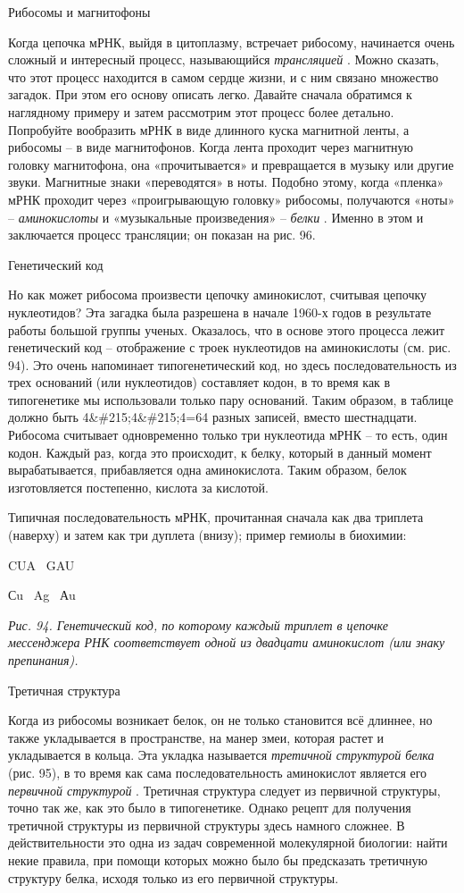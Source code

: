 \documentclass[../main.tex]{subfiles}
\begin{document}
Рибосомы и магнитофоны

Когда цепочка мРНК, выйдя в цитоплазму, встречает рибосому, начинается очень сложный и интересный процесс, называющийся \emph{трансляцией} . Можно сказать, что этот процесс находится в самом сердце жизни, и с ним связано множество загадок. При этом его основу описать легко. Давайте сначала обратимся к наглядному примеру и затем рассмотрим этот процесс более детально. Попробуйте вообразить мРНК в виде длинного куска магнитной ленты, а рибосомы \--- в виде магнитофонов. Когда лента проходит через магнитную головку магнитофона, она «прочитывается» и превращается в музыку или другие звуки. Магнитные знаки «переводятся» в ноты. Подобно этому, когда «пленка» мРНК проходит через «проигрывающую головку» рибосомы, получаются «ноты» \--- \emph{аминокислоты} и «музыкальные произведения» \--- \emph{белки} . Именно в этом и заключается процесс трансляции; он показан на рис. 96.

Генетический код

Но как может рибосома произвести цепочку аминокислот, считывая цепочку нуклеотидов? Эта загадка была разрешена в начале 1960-х годов в результате работы большой группы ученых. Оказалось, что в основе этого процесса лежит генетический код \--- отображение с троек нуклеотидов на аминокислоты (см. рис. 94). Это очень напоминает типогенетический код, но здесь последовательность из трех оснований (или нуклеотидов) составляет кодон, в то время как в типогенетике мы использовали только пару оснований. Таким образом, в таблице должно быть 4\&\#215;4\&\#215;4=64 разных записей, вместо шестнадцати. Рибосома считывает одновременно только три нуклеотида мРНК \--- то есть, один кодон. Каждый раз, когда это происходит, к белку, который в данный момент вырабатывается, прибавляется одна аминокислота. Таким образом, белок изготовляется постепенно, кислота за кислотой.

Типичная последовательность мРНК, прочитанная сначала как два триплета (наверху) и затем как три дуплета (внизу); пример гемиолы в биохимии:

CUA ~GAU

Сu ~Ag ~Аu

\emph{Рис. 94. Генетический код, по которому каждый триплет в цепочке мессенджера РНК соответствует одной из двадцати аминокислот (или знаку препинания).}

Третичная структура

Когда из рибосомы возникает белок, он не только становится всё длиннее, но также укладывается в пространстве, на манер змеи, которая растет и укладывается в кольца. Эта укладка называется \emph{третичной структурой белка} (рис. 95), в то время как сама последовательность аминокислот является его \emph{первичной структурой} . Третичная структура следует из первичной структуры, точно так же, как это было в типогенетике. Однако рецепт для получения третичной структуры из первичной структуры здесь намного сложнее. В действительности это одна из задач современной молекулярной биологии: найти некие правила, при помощи которых можно было бы предсказать третичную структуру белка, исходя только из его первичной структуры.
\end{document}
